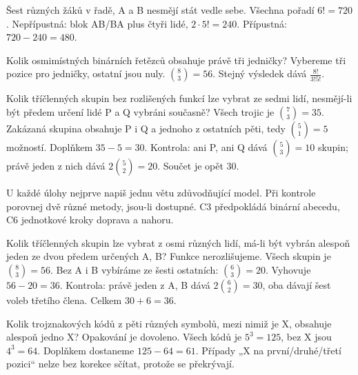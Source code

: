 \documentclass[11pt,a4paper]{article}
\begin{document}
\begin{prikladReseniBox}[title={Příklad P4}]
Šest různých žáků v řadě, A a B nesmějí stát vedle sebe.
\tcblower
Všechna pořadí \(6!=720\). Nepřípustná: blok AB/BA plus čtyři lidé, \(2\cdot5!=240\). Přípustná: \(720-240=480\).
\end{prikladReseniBox}


\begin{prikladReseniBox}[title={Příklad P5}]
Kolik osmimístných binárních řetězců obsahuje právě tři jedničky?
\tcblower
Vybereme tři pozice pro jedničky, ostatní jsou nuly. \(\binom83=56\). Stejný výsledek dává \(\frac{8!}{3!5!}\).
\end{prikladReseniBox}


\begin{prikladReseniBox}[title={Příklad P6}]
Kolik tříčlenných skupin bez rozlišených funkcí lze vybrat ze sedmi lidí, nesmějí-li být předem určení lidé P a Q vybráni současně?
\tcblower
Všech trojic je $\binom73=35$. Zakázaná skupina obsahuje P i Q a jednoho z ostatních pěti, tedy $\binom51=5$ možností. Doplňkem $35-5=30$. Kontrola: ani P, ani Q dává $\binom53=10$ skupin; právě jeden z nich dává $2\binom52=20$. Součet je opět $30$.
\end{prikladReseniBox}


\newpage
{}

U každé úlohy nejprve napiš jednu větu zdůvodňující model. Při kontrole porovnej dvě různé metody, jsou-li dostupné. C3 předpokládá binární abecedu, C6 jednotkové kroky doprava a nahoru.

\begin{zadaniReseniBox}[title={Úloha C1}]
Kolik tříčlenných skupin lze vybrat z osmi různých lidí, má-li být vybrán alespoň jeden ze dvou předem určených A, B? Funkce nerozlišujeme.
\tcblower
Všech skupin je $\binom83=56$. Bez A i B vybíráme ze šesti ostatních: $\binom63=20$. Vyhovuje $56-20=36$. Kontrola: právě jeden z A, B dává $2\binom62=30$, oba dávají šest voleb třetího člena. Celkem $30+6=36$.
\end{zadaniReseniBox}

\begin{zadaniReseniBox}[title={Úloha C2}]
Kolik trojznakových kódů z pěti různých symbolů, mezi nimiž je X, obsahuje alespoň jedno X? Opakování je dovoleno.
\tcblower
Všech kódů je $5^3=125$, bez X jsou $4^3=64$. Doplňkem dostaneme $125-64=61$. Případy „X na první/druhé/třetí pozici“ nelze bez korekce sčítat, protože se překrývají.
\end{zadaniReseniBox}
\end{document}
